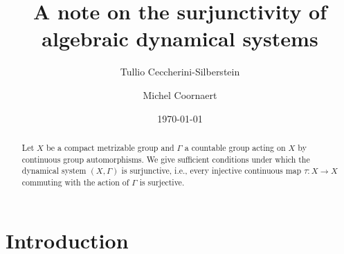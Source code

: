 \documentclass[12pt,a4paper]{amsart}
\theoremstyle{definition}
\numberwithin{equation}{section}
\begin{document}
\title[Surjunctivity of algebraic dynamical systems]{A note on the surjunctivity of algebraic dynamical systems}
\author{Tullio Ceccherini-Silberstein}
\address{Dipartimento di Ingegneria, Universit\`a del Sannio, C.so
Garibaldi 107, 82100 Benevento, Italy}
\author{Michel Coornaert}
\address{Universit\'e de Strasbourg, CNRS, IRMA UMR 7501, F-67000 Strasbourg, France}
\begin{abstract}
Let $X$ be a compact  metrizable  group and  $\Gamma$  a countable group acting  on $X$ by continuous group automorphisms.
We give sufficient conditions under which the dynamical system $(X,\Gamma)$ is  surjunctive, i.e.,
every injective continuous map $\tau \colon X \to X$ commuting with the action of 
$\Gamma$  is surjective.
\end{abstract}
\date{\today}
\maketitle

\section{Introduction}
\end{document}
